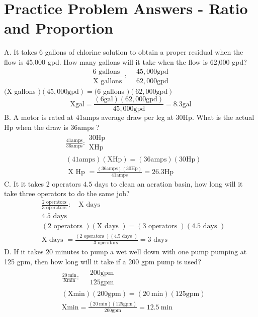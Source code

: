\section{Practice Problem Answers - Ratio and Proportion}
A. It takes 6 gallons of chlorine solution to obtain a proper residual when the flow is 45,000 gpd. How many gallons will it take when the flow is 62,000 gpd?
$$
\frac{6 \text { gallons }}{\text { X gallons }}: \begin{aligned}
&45,000 \mathrm{gpd} \\
&62,000 \mathrm{gpd}
\end{aligned}
$$
$(\mathrm{X}$ gallons $)(45,000 \mathrm{gpd})=(6$ gallons $)(62,000 \mathrm{gpd})$
$$
\mathrm{X} \mathrm{gal}=\frac{(6 \mathrm{gal})(62,000 \mathrm{gpd})}{45,000 \mathrm{gpd}}=8.3 \mathrm{gal}
$$
B. A motor is rated at $41 \mathrm{amps}$ average draw per leg at $30 \mathrm{Hp}$. What is the actual $\mathrm{Hp}$ when the draw is $36 \mathrm{amps}$ ?
$$
\begin{aligned}
&\frac{41 \mathrm{amps}}{36 \mathrm{amps}}: \begin{array}{l}
30 \mathrm{Hp} \\
\mathrm{XHp}
\end{array} \\
&(41 \mathrm{amps})(\mathrm{X} \mathrm{Hp})=(36 \mathrm{amps})(30 \mathrm{Hp}) \\
&\text { X Hp }=\frac{(36 \mathrm{amps})(30 \mathrm{Hp})}{41 \mathrm{amps}}=26.3 \mathrm{Hp}
\end{aligned}
$$
C. It it takes 2 operators $4.5$ days to clean an aeration basin, how long will it take three operators to do the same job?
$$
\begin{aligned}
&\frac{2 \text { operators }}{3 \text { operators }}: \quad \mathrm{X} \text { days } \\
&4.5 \text { days } \\
&(2 \text { operators })(\mathrm{X} \text { days })=(3 \text { operators })(4.5 \text { days }) \\
&\mathrm{X} \text { days }=\frac{(2 \text { operators })(4.5 \text { days })}{3 \text { operators }}=3 \text { days }
\end{aligned}
$$
D. If it takes 20 minutes to pump a wet well down with one pump pumping at 125 gpm, then how long will it take if a 200 gpm pump is used?
$$
\begin{aligned}
&\frac{20 \mathrm{~min}}{\mathrm{Xmin}}: \quad \begin{array}{l}
200 \mathrm{gpm} \\
125 \mathrm{gpm}
\end{array} \\
&(\mathrm{Xmin})(200 \mathrm{gpm})=(20 \mathrm{~min})(125 \mathrm{gpm}) \\
&\mathrm{Xmin}=\frac{(20 \mathrm{~min})(125 \mathrm{gpm})}{200 \mathrm{gpm}}=12.5 \mathrm{~min}
\end{aligned}
$$
